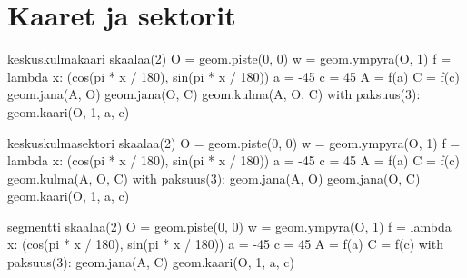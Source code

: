 \section*{Kaaret ja sektorit}

\begin{luoKuva}{keskuskulmakaari}
	skaalaa(2)
	O = geom.piste(0, 0)
	w = geom.ympyra(O, 1)
	f = lambda x: (cos(pi * x / 180), sin(pi * x / 180))
	a = -45
	c = 45
	A = f(a)
	C = f(c)
	geom.jana(A, O)
	geom.jana(O, C)
	geom.kulma(A, O, C)
	with paksuus(3):
		geom.kaari(O, 1, a, c)
\end{luoKuva}
\begin{luoKuva}{keskuskulmasektori}
	skaalaa(2)
	O = geom.piste(0, 0)
	w = geom.ympyra(O, 1)
	f = lambda x: (cos(pi * x / 180), sin(pi * x / 180))
	a = -45
	c = 45
	A = f(a)
	C = f(c)
	geom.kulma(A, O, C)
	with paksuus(3):
		geom.jana(A, O)
		geom.jana(O, C)
		geom.kaari(O, 1, a, c)
\end{luoKuva}
\begin{luoKuva}{segmentti}
	skaalaa(2)
	O = geom.piste(0, 0)
	w = geom.ympyra(O, 1)
	f = lambda x: (cos(pi * x / 180), sin(pi * x / 180))
	a = -45
	c = 45
	A = f(a)
	C = f(c)
	with paksuus(3):
		geom.jana(A, C)
		geom.kaari(O, 1, a, c)
\end{luoKuva}

